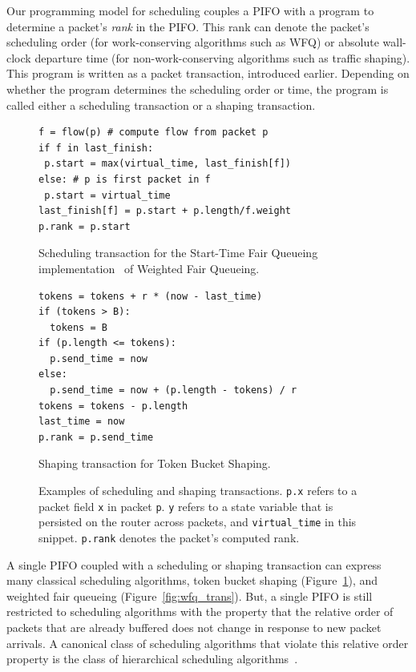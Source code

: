  Our programming model for
scheduling couples a PIFO with a program to determine a packet's {\em rank} in
the PIFO. This rank can denote the packet's scheduling order (for
work-conserving algorithms such as WFQ) or absolute wall-clock departure time
(for non-work-conserving algorithms such as traffic shaping). This program is
written as a packet transaction, introduced earlier.  Depending on whether the
program determines the scheduling order or time, the program is called either a
scheduling transaction or a shaping transaction.

\begin{figure}
\begin{minipage}[!h]{0.48\textwidth}
\vspace{0.4in}
\begin{lstlisting}[style=customcscriptsize]
f = flow(p) # compute flow from packet p
if f in last_finish:
 p.start = max(virtual_time, last_finish[f])
else: # p is first packet in f
 p.start = virtual_time
last_finish[f] = p.start + p.length/f.weight
p.rank = p.start
\end{lstlisting}
\caption{Scheduling transaction for the Start-Time Fair Queueing implementation~\cite{stfq} of Weighted Fair Queueing.}
\label{fig:wfq_trans}
\hfill
\end{minipage}
\begin{minipage}[!h]{0.48\textwidth}
\begin{lstlisting}[style=customcscriptsize]
tokens = tokens + r * (now - last_time)
if (tokens > B):
  tokens = B
if (p.length <= tokens):
  p.send_time = now
else:
  p.send_time = now + (p.length - tokens) / r
tokens = tokens - p.length
last_time = now
p.rank = p.send_time
\end{lstlisting}
\caption{Shaping transaction for Token Bucket Shaping.}
\label{fig:tbf_trans}
\end{minipage}
\caption{Examples of scheduling and shaping transactions. {\tt p.x} refers to a packet field {\tt x} in packet {\tt p}.  {\tt y} refers to a state variable
that is persisted on the router across packets, 
and {\tt virtual\_time} in this snippet. {\tt p.rank} denotes the
packet's computed rank.}
\end{figure}

A single PIFO coupled with a scheduling or shaping transaction can express many
classical scheduling algorithms, \eg token bucket shaping
(Figure~\ref{fig:tbf_trans}), and weighted fair queueing
(Figure~\ref{fig:wfq_trans}). But, a single PIFO is still restricted to
scheduling algorithms with the property that the relative order of packets that
are already buffered does not change in response to new packet arrivals. A
canonical class of scheduling algorithms that violate this relative order
property is the class of hierarchical scheduling algorithms~\cite{hpfq}.
 
